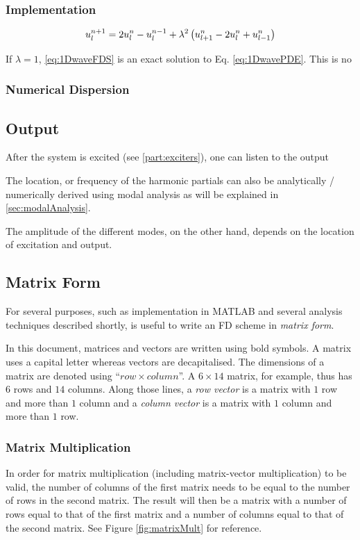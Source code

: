 \subsubsection{Implementation}
\begin{equation}\label{eq:1DwaveUpdate}
    u_l^{n+1} = 2 u_l^n - u_l^{n-1} + \lambda^2 \left(u_{l+1}^n - 2 u_l^n + u_{l-1}^n\right)
\end{equation}

If $\lambda = 1$, \eqref{eq:1DwaveFDS} is an exact solution to Eq. \eqref{eq:1DwavePDE}. This is no

\subsubsection{Numerical Dispersion}


\subsection{Output}
After the system is excited (see \ref{part:exciters}), one can listen to the output

The location, or frequency of the harmonic partials can also be analytically / numerically derived using modal analysis as will be explained in \ref{sec:modalAnalysis}.

The amplitude of the different modes, on the other hand, depends on the location of excitation and output. 


\subsection{Matrix Form}
For several purposes, such as implementation in MATLAB and several analysis techniques described shortly, is useful to write an FD scheme in \textit{matrix form}. 

In this document, matrices and vectors are written using bold symbols.  A matrix uses a capital letter whereas vectors are decapitalised. The dimensions of a matrix are denoted using ``$row \times column$''. A $6\times 14$ matrix, for example, thus has $6$ rows and $14$ columns. Along those lines, a \textit{row vector} is a matrix with $1$ row and more than $1$ column and a \textit{column vector} is a matrix with $1$ column and more than $1$ row. 

\subsubsection{Matrix Multiplication}
In order for matrix multiplication (including matrix-vector multiplication) to be valid, the number of columns of the first matrix needs to be equal to the number of rows in the second matrix. The result will then be a matrix with a number of rows equal to that of the first matrix and a number of columns equal to that of the second matrix. See Figure \ref{fig:matrixMult} for reference.

